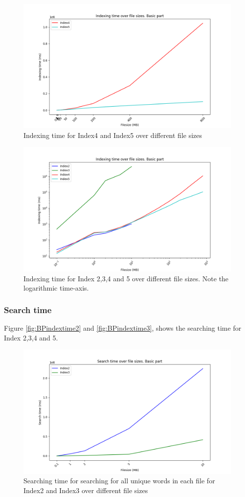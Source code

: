 \begin{figure}[H]
    \centering
    \includegraphics[width=.8\textwidth]{LaTeX/Pictures/Results/BPIndexing[4, 5].png}
    \caption{Indexing time for Index4 and Index5 over different file sizes}
    \label{fig:BPindextime45}
\end{figure}

\begin{figure}[H]
    \centering
    \includegraphics[width=.8\textwidth]{LaTeX/Pictures/Results/BPIndexing[2, 3, 4, 5].png}
    \caption{Indexing time for Index 2,3,4 and 5 over different file sizes. Note the logarithmic time-axis.}
    \label{fig:BPindextime2345}
\end{figure}

\subsubsection{Search time}
Figure \ref{fig:BPindextime2} and \ref{fig:BPindextime3}, shows the searching time for Index 2,3,4 and 5.

\begin{figure}[H]
    \centering
    \includegraphics[width=.8\textwidth]{LaTeX/Pictures/Results/BPSearch[2, 3].png}
    \caption{Searching time for searching for all unique words in each file for Index2 and Index3 over different file sizes}
    \label{fig:BPsearch23}
\end{figure}

